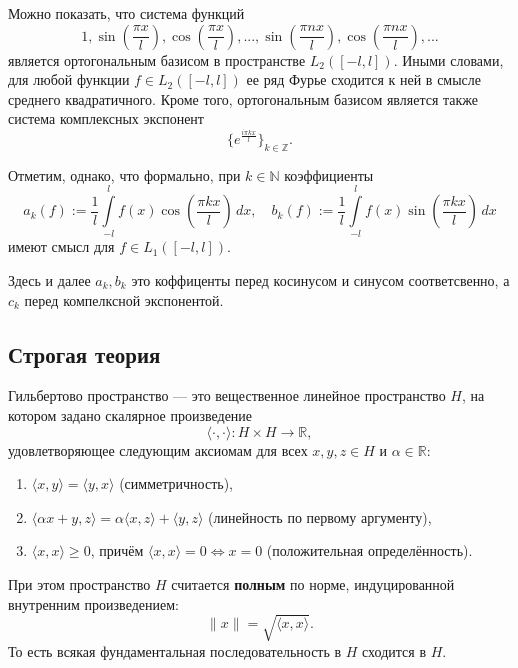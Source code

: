 Можно показать, что система функций
\begin{equation}
\label{eqq.trigonometric_system}
1,\sin(\frac{\pi x}{l}), \cos(\frac{\pi x}{l}), ... ,\sin(\frac{\pi n x}{l}),\cos(\frac{\pi n x}{l}),...
\end{equation}
является ортогональным базисом в пространстве $L_{2}([-l,l])$. Иными словами, для любой функции $f \in L_{2}([-l,l])$ ее ряд Фурье сходится к ней в смысле среднего квадратичного.
Кроме того, ортогональным базисом является также система комплексных экспонент
\begin{equation}
\label{eqq.trigonometric_system_2}
\{e^{\frac{i\pi kx}{l}}\}_{k \in \mathbb{Z}}.
\end{equation}



Отметим, однако, что формально, при $k \in \mathbb{N}$ коэффициенты
$$
a_{k}(f):=\frac{1}{l}\int\limits_{-l}^{l}f(x)\cos(\frac{\pi k x}{l})\,dx, \quad b_{k}(f):=\frac{1}{l}\int\limits_{-l}^{l}f(x)\sin(\frac{\pi k x}{l})\,dx
$$
имеют смысл для $f \in L_{1}([-l,l])$.

\begin{note}
    Здесь и далее $a_k, b_k$ это коффиценты перед косинусом и синусом соответсвенно, а $c_k$ перед компелксной экспонентой.
\end{note}

\subsection{Строгая теория}

\begin{definition}
    Гильбертово пространство — это вещественное линейное пространство \( H \), на котором задано скалярное произведение
\[
\langle \cdot, \cdot \rangle : H \times H \to \mathbb{R},
\]
удовлетворяющее следующим аксиомам для всех \( x, y, z \in H \) и \( \alpha \in \mathbb{R} \):
\begin{enumerate}
    \item \( \langle x, y \rangle = \langle y, x \rangle \) (симметричность),
    \item \( \langle \alpha x + y, z \rangle = \alpha \langle x, z \rangle + \langle y, z \rangle \) (линейность по первому аргументу),
    \item \( \langle x, x \rangle \geq 0 \), причём \( \langle x, x \rangle = 0 \iff x = 0 \) (положительная определённость).
\end{enumerate}
При этом пространство \( H \) считается \textbf{полным} по норме, индуцированной внутренним произведением:
\[
\|x\| = \sqrt{\langle x, x \rangle}.
\]
То есть всякая фундаментальная последовательность в \( H \) сходится в \( H \).
\end{definition}

